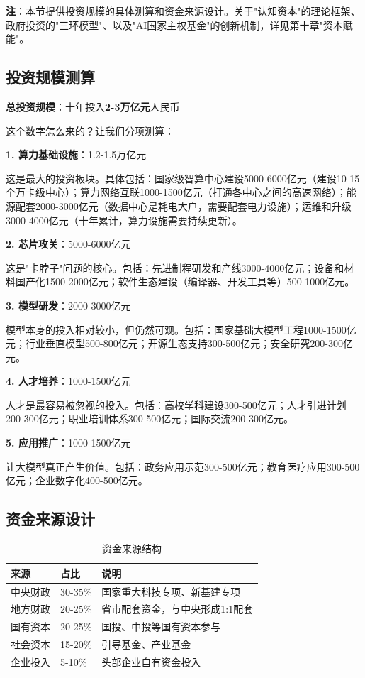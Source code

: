 \textbf{注}：本节提供投资规模的具体测算和资金来源设计。关于"认知资本"的理论框架、政府投资的"三环模型"、以及"AI国家主权基金"的创新机制，详见第十章"资本赋能"。

\subsection{投资规模测算}

\textbf{总投资规模}：十年投入\textbf{2-3万亿元}人民币

这个数字怎么来的？让我们分项测算：

\textbf{1. 算力基础设施}：1.2-1.5万亿元

这是最大的投资板块。具体包括：国家级智算中心建设5000-6000亿元（建设10-15个万卡级中心）；算力网络互联1000-1500亿元（打通各中心之间的高速网络）；能源配套2000-3000亿元（数据中心是耗电大户，需要配套电力设施）；运维和升级3000-4000亿元（十年累计，算力设施需要持续更新）。

\textbf{2. 芯片攻关}：5000-6000亿元

这是"卡脖子"问题的核心。包括：先进制程研发和产线3000-4000亿元；设备和材料国产化1500-2000亿元；软件生态建设（编译器、开发工具等）500-1000亿元。

\textbf{3. 模型研发}：2000-3000亿元

模型本身的投入相对较小，但仍然可观。包括：国家基础大模型工程1000-1500亿元；行业垂直模型500-800亿元；开源生态支持300-500亿元；安全研究200-300亿元。

\textbf{4. 人才培养}：1000-1500亿元

人才是最容易被忽视的投入。包括：高校学科建设300-500亿元；人才引进计划200-300亿元；职业培训体系300-500亿元；国际交流200-300亿元。

\textbf{5. 应用推广}：1000-1500亿元

让大模型真正产生价值。包括：政务应用示范300-500亿元；教育医疗应用300-500亿元；企业数字化400-500亿元。

\subsection{资金来源设计}

\begin{table}[H]
\centering
\caption{资金来源结构}
\small
\begin{tabular}{p{3cm}p{2cm}p{7cm}}
\toprule
\textbf{来源} & \textbf{占比} & \textbf{说明} \\
\midrule
中央财政 & 30-35\% & 国家重大科技专项、新基建专项 \\
地方财政 & 20-25\% & 省市配套资金，与中央形成1:1配套 \\
国有资本 & 20-25\% & 国投、中投等国有资本参与 \\
社会资本 & 15-20\% & 引导基金、产业基金 \\
企业投入 & 5-10\% & 头部企业自有资金投入 \\
\bottomrule
\end{tabular}
\end{table}

